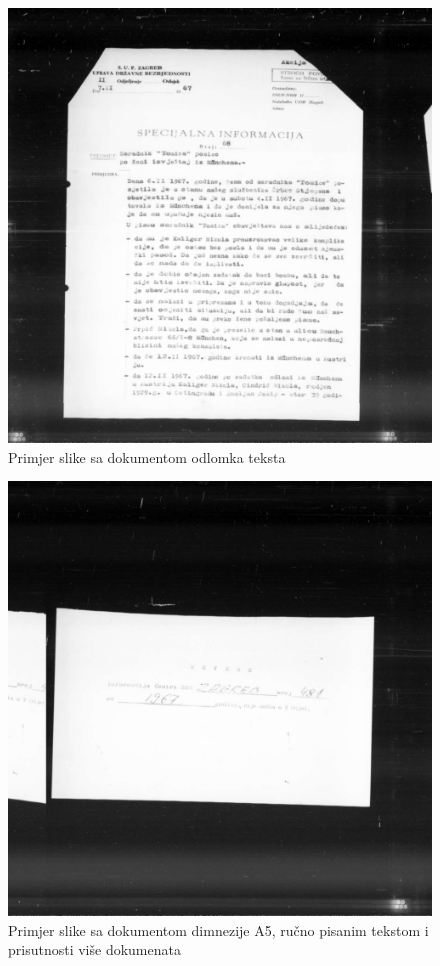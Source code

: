 \documentclass[times, utf8, zavrsni, numeric]{fer}
\begin{document}
\begin{figure}[H]
        \centering
	\includegraphics[scale=0.96]{images/opis/Z05353615.jpg}
	\caption{Primjer slike sa dokumentom odlomka teksta}
	\label{fig:binary_example}
\end{figure}
\begin{figure}[H]
        \centering
	\includegraphics[scale=0.96]{images/opis/Z05354476.jpg}
	\caption{Primjer slike sa dokumentom dimnezije A5, ručno pisanim tekstom i prisutnosti više dokumenata}
	\label{fig:binary_example}
\end{figure}
\end{document}
